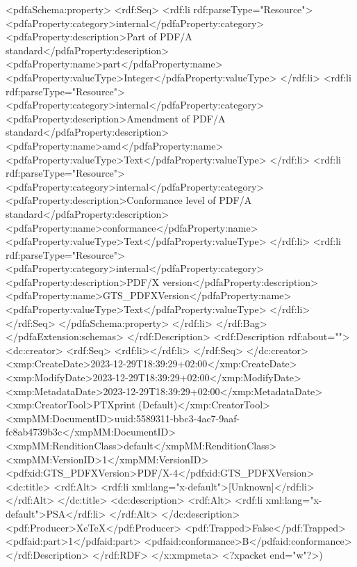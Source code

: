 {              <pdfaSchema:property>
                <rdf:Seq>
                  <rdf:li rdf:parseType="Resource">
                    <pdfaProperty:category>internal</pdfaProperty:category>
                    <pdfaProperty:description>Part of PDF/A standard</pdfaProperty:description>
                    <pdfaProperty:name>part</pdfaProperty:name>
                    <pdfaProperty:valueType>Integer</pdfaProperty:valueType>
                  </rdf:li>
                  <rdf:li rdf:parseType="Resource">
                    <pdfaProperty:category>internal</pdfaProperty:category>
                    <pdfaProperty:description>Amendment of PDF/A standard</pdfaProperty:description>
                    <pdfaProperty:name>amd</pdfaProperty:name>
                    <pdfaProperty:valueType>Text</pdfaProperty:valueType>
                  </rdf:li>
                  <rdf:li rdf:parseType="Resource">
                    <pdfaProperty:category>internal</pdfaProperty:category>
                    <pdfaProperty:description>Conformance level of PDF/A standard</pdfaProperty:description>
                    <pdfaProperty:name>conformance</pdfaProperty:name>
                    <pdfaProperty:valueType>Text</pdfaProperty:valueType>
                  </rdf:li>
                  <rdf:li rdf:parseType="Resource">
                    <pdfaProperty:category>internal</pdfaProperty:category>
                    <pdfaProperty:description>PDF/X version</pdfaProperty:description>
                    <pdfaProperty:name>GTS_PDFXVersion</pdfaProperty:name>
                    <pdfaProperty:valueType>Text</pdfaProperty:valueType>
                  </rdf:li>
                </rdf:Seq>
              </pdfaSchema:property>
            </rdf:li>
          </rdf:Bag>
        </pdfaExtension:schemas>
      </rdf:Description>
      <rdf:Description rdf:about="">
        <dc:creator>
          <rdf:Seq>
            <rdf:li></rdf:li>
          </rdf:Seq>
        </dc:creator>
        <xmp:CreateDate>2023-12-29T18:39:29+02:00</xmp:CreateDate>
        <xmp:ModifyDate>2023-12-29T18:39:29+02:00</xmp:ModifyDate>
        <xmp:MetadataDate>2023-12-29T18:39:29+02:00</xmp:MetadataDate>
        <xmp:CreatorTool>PTXprint (Default)</xmp:CreatorTool>
        <xmpMM:DocumentID>uuid:5589311-bbc3-4ac7-9aaf-fc8ab4739b3c</xmpMM:DocumentID>
        <xmpMM:RenditionClass>default</xmpMM:RenditionClass>
        <xmpMM:VersionID>1</xmpMM:VersionID>
        <pdfxid:GTS_PDFXVersion>PDF/X-4</pdfxid:GTS_PDFXVersion>
        <dc:title>
          <rdf:Alt>
            <rdf:li xml:lang="x-default">[Unknown]</rdf:li>
          </rdf:Alt>
        </dc:title>
        <dc:description>
          <rdf:Alt>
            <rdf:li xml:lang="x-default">PSA</rdf:li>
          </rdf:Alt>
        </dc:description>
        <pdf:Producer>XeTeX</pdf:Producer>
        <pdf:Trapped>False</pdf:Trapped>
      <pdfaid:part>1</pdfaid:part>
      <pdfaid:conformance>B</pdfaid:conformance>
      </rdf:Description>
  </rdf:RDF>
</x:xmpmeta>
<?xpacket end="w"?>)}
